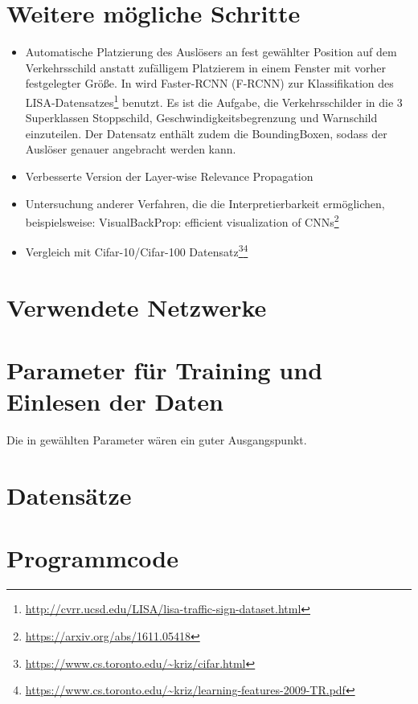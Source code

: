\documentclass{article}
\theoremstyle{break}
\begin{document}
	\section{Weitere mögliche Schritte}
	\begin{itemize}
		\item Automatische Platzierung des Auslösers an fest gewählter Position auf dem Verkehrsschild anstatt zufälligem Platzierem in einem Fenster mit vorher festgelegter Größe. In \cite{badnets} wird  Faster-RCNN (F-RCNN) zur Klassifikation des LISA-Datensatzes\footnote{\url{http://cvrr.ucsd.edu/LISA/lisa-traffic-sign-dataset.html}} benutzt. Es ist die Aufgabe, die Verkehrsschilder in die 3 Superklassen Stoppschild, Geschwindigkeitsbegrenzung und Warnschild einzuteilen. Der Datensatz enthält zudem die BoundingBoxen, sodass der Auslöser genauer angebracht werden kann.
		\item Verbesserte Version der Layer-wise Relevance Propagation
		\item Untersuchung anderer Verfahren, die die Interpretierbarkeit ermöglichen, beispielsweise: VisualBackProp: efficient visualization of CNNs\footnote{\url{https://arxiv.org/abs/1611.05418}}
		\item Vergleich mit Cifar-10/Cifar-100 Datensatz\footnote{\url{https://www.cs.toronto.edu/~kriz/cifar.html}}\footnote{\url{https://www.cs.toronto.edu/~kriz/learning-features-2009-TR.pdf}}
	\end{itemize}
	
	\newpage
	\appendix
	\section{Verwendete Netzwerke}
	\section{Parameter für Training und Einlesen der Daten}
	Die in \cite{CH} gewählten Parameter wären ein guter Ausgangspunkt.
	\section{Datensätze}
	\section{Programmcode}
\end{document}
